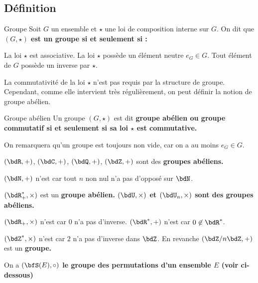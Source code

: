 \documentclass[a4paper,french,bookmarks]{article}
\begin{document}
\subsection{Définition}

\begin{definition}{Groupe}{}
    Soit $G$ un ensemble et $\star$ une loi de composition interne sur $G$. On dit que \bf{$(G, \star)$ est un groupe} si et seulement si :
    \begin{enumerate}
        \ithand La loi $\star$ est associative.
        \ithand La loi $\star$ possède un élément neutre $e_G \in G$.
        \ithand Tout élément de $G$ possède un inverse par $\star$.
    \end{enumerate}
\end{definition}

La commutativité de la loi $\star$ n'est pas requis par la structure de groupe. Cependant, comme elle intervient très régulièrement, on peut définir la notion de groupe abélien.

\begin{definition}{Groupe abélien}{}
    Un groupe $(G, \star)$ est dit \bf{groupe abélien} ou \bf{groupe commutatif} si et seulement si sa loi $\star$ est commutative.
\end{definition}

On remarquera qu'un groupe est toujours non vide, car on a au moins $e_G \in G$.

\begin{example}{}{}
    \begin{enumerate}
        \ithand $(\bdR, +)$, $(\bdC, +)$, $(\bdQ, +)$, $(\bdZ, +)$ sont des \bf{groupes abéliens.}
        
        \ithand $(\bdN, +)$ n'est \textit{} car tout $n$ non nul n'a pas d'opposé sur $\bdN$.
        
        \ithand $(\bdR_+^*, \times)$ est un \bf{groupe abélien.} $(\bdU, \times)$ et $(\bdU_n, \times)$ sont des \bf{groupes abéliens}.
        
        \ithand $(\bdR_+, \times)$ n'est \textit{} car $0$ n'a pas d'inverse. $(\bdR^*, +)$ n'est \textit{} car $0 \not\in \bdR^*$.
        
        \ithand $(\bdZ^*, \times)$ n'est \textit{} car $2$ n'a pas d'inverse dans $\bdZ$. En revanche $(\bdZ/n\bdZ, +)$ est un \bf{groupe}. 
        
        \ithand On a \bf{$(\bfS(E), \circ)$ le groupe des permutations} d'un ensemble $E$ (voir ci-dessous)
    \end{enumerate}
\end{example}
\end{document}
